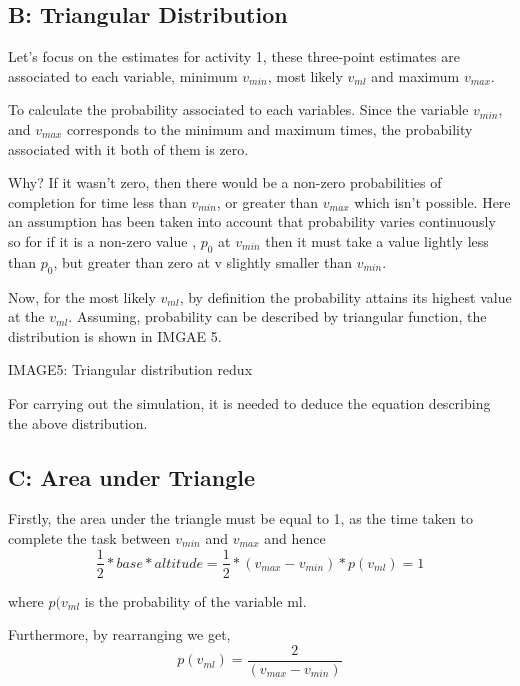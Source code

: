 \subsection{B: Triangular Distribution}

Let's focus on the estimates for activity 1, these three-point estimates are associated to each variable, minimum $v_ {min}$, most likely $v_ {ml}$ and maximum $v_ {max}$.

To calculate the probability associated to each variables. Since the variable $v_ {min}$, and $v_ {max}$ corresponds to the minimum and maximum times, the probability associated with it both of them is zero. 

Why?
If it wasn't zero, then there would be a non-zero probabilities of completion for time less than $v_{min}$, or greater than $v_{max}$ which isn't possible. Here an assumption has been taken into account that probability varies continuously so for if it is a non-zero value , $p_{0}$  at $v_{min}$ then it must take a value lightly less than $p_{0}$, but greater than zero at v slightly smaller than $v_{min}$.

Now, for the most likely $v_ {ml}$, by definition the probability attains its highest value at the $v_ {ml}$. Assuming, probability can be described by triangular function, the distribution is shown in IMGAE 5.

IMAGE5: Triangular distribution redux

For carrying out the simulation, it is needed to deduce the equation describing the above distribution.


\subsection{C: Area under Triangle}

Firstly, the area under the triangle must be equal to 1, as the time taken to complete the task between $ v_{min} $ and $ v_{max} $ and hence 
\begin{equation}
\frac{1}{2} * base * altitude = \frac{1}{2} * (v_{max} - v_{min} ) * p(v_{ml}) = 1
\label{eqn3}
\end{equation}

where $p(v_{ml} $ is the probability of the variable ml.

Furthermore, by rearranging we get, 
\begin{equation}
p(v_{ml}) = \frac{2}{  (v_{max} - v_{min})} 
\label{eqn4}
\end{equation}

